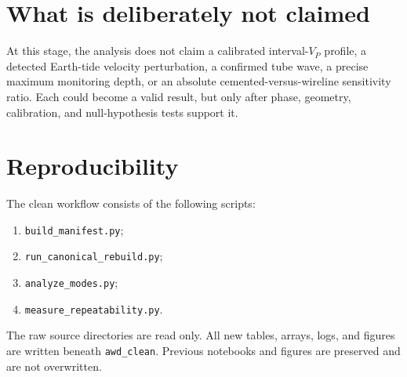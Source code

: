 \documentclass[11pt]{article}
\newcommand{\code}[1]{\texttt{#1}}
\begin{document}
\section{What is deliberately not claimed}

At this stage, the analysis does not claim a calibrated interval-$V_P$ profile,
a detected Earth-tide velocity perturbation, a confirmed tube wave, a precise
maximum monitoring depth, or an absolute cemented-versus-wireline sensitivity
ratio.  Each could become a valid result, but only after phase, geometry,
calibration, and null-hypothesis tests support it.

\section{Reproducibility}

The clean workflow consists of the following scripts:
\begin{enumerate}
    \item \code{build\_manifest.py};
    \item \code{run\_canonical\_rebuild.py};
    \item \code{analyze\_modes.py};
    \item \code{measure\_repeatability.py}.
\end{enumerate}
The raw source directories are read only.  All new tables, arrays, logs, and
figures are written beneath \code{awd\_clean}.  Previous notebooks and figures
are preserved and are not overwritten.
\end{document}
